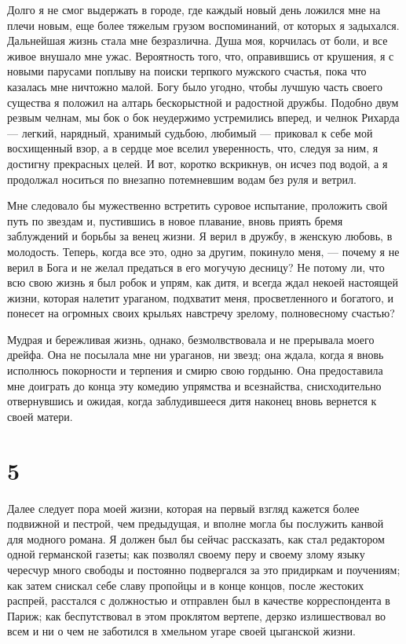 Долго я не смог выдержать в  городе, где каждый новый день ложился мне
на плечи  новым, еще более  тяжелым грузом воспоминаний, от  которых я
задыхался. Дальнейшая жизнь стала мне безразлична. Душа моя, корчилась
от  боли,  и  все  живое  внушало мне  ужас.  Вероятность  того,  что,
оправившись  от  крушения,  я  с новыми  парусами  поплыву  на  поиски
терпкого мужского счастья, пока что  казалась мне ничтожно малой. Богу
было угодно,  чтобы лучшую часть  своего существа я положил  на алтарь
бескорыстной  и  радостной  дружбы.  Подобно двум  резвым  челнам,  мы
бок  о  бок  неудержимо  устремились  вперед,  и  челнок  Рихарда  ---
легкий, нарядный,  хранимый судьбою, любимый  --- приковал к  себе мой
восхищенный взор,  а в сердце  мое вселил уверенность, что,  следуя за
ним, я достигну  прекрасных целей. И вот, коротко  вскрикнув, он исчез
под водой,  а я продолжал  носиться по внезапно потемневшим  водам без
руля и ветрил.

Мне следовало  бы мужественно  встретить суровое  испытание, проложить
свой  путь по  звездам и,  пустившись в  новое плавание,  вновь приять
бремя заблуждений и борьбы за венец жизни. Я верил в дружбу, в женскую
любовь, в молодость.  Теперь, когда все это, одно  за другим, покинуло
меня, --- почему я не верил в  Бога и не желал предаться в его могучую
десницу? Не  потому ли, что  всю свою жизнь я  был робок и  упрям, как
дитя, и всегда ждал некоей  настоящей жизни, которая налетит ураганом,
подхватит меня, просветленного и богатого, и понесет на огромных своих
крыльях навстречу зрелому, полновесному счастью?

Мудрая  и бережливая  жизнь,  однако, безмолвствовала  и не  прерывала
моего дрейфа.  Она не посылала мне  ни ураганов, ни звезд;  она ждала,
когда я  вновь исполнюсь покорности  и терпения и смирю  свою гордыню.
Она  предоставила  мне  доиграть  до конца  эту  комедию  упрямства  и
всезнайства, снисходительно отвернувшись и ожидая, когда заблудившееся
дитя наконец вновь вернется к своей матери.


\section*{5}


Далее следует пора моей жизни,  которая на первый взгляд кажется более
подвижной  и пестрой,  чем  предыдущая, и  вполне  могла бы  послужить
канвой для модного романа. Я должен был бы сейчас рассказать, как стал
редактором одной германской газеты; как  позволял своему перу и своему
злому  языку чересчур  много свободы  и постоянно  подвергался за  это
придиркам и поучениям; как затем снискал себе славу пропойцы и в конце
концов, после жестоких распрей, расстался с должностью и отправлен был
в качестве корреспондента в Париж;  как беспутствовал в этом проклятом
вертепе,  дерзко излишествовал  во  всем и  ни о  чем  не заботился  в
хмельном угаре своей цыганской жизни.


